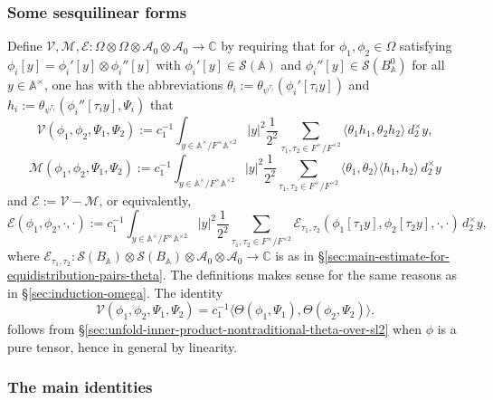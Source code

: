 \documentclass[reqno,10pt]{amsart}
\theoremstyle{plain} %
\theoremstyle{definition}
\theoremstyle{plain} %
\theoremstyle{remark}
\theoremstyle{itplain} %
\theoremstyle{remark} %
\numberwithin{equation}{section}
\begin{document}
\subsubsection{Some sesquilinear forms}\label{sec:35ac3e5754}
Define $\mathcal{V}, \mathcal{M}, \mathcal{E} : \Omega \otimes \Omega \otimes \mathcal{A}_0 \otimes \mathcal{A}_0 \rightarrow \mathbb{C}$ by requiring that for $\phi_1, \phi_2 \in \Omega$ satisfying $\phi_i[y] = \phi_i'[y] \otimes \phi_i''[y]$ with $\phi_i'[y] \in \mathcal{S}(\mathbb{A})$ and $ \phi_i''[y] \in \mathcal{S}(B_\mathbb{A}^0)$ for all $y \in \mathbb{A}^\times$, one has with the abbreviations $\theta_i := \theta_{\psi^{\tau_i}}(\phi_i'[\tau_i y])$ and $h_i := \theta_{\psi^{\tau_i}}(\phi_i''[\tau_i y],\Psi_i)$ that
\[
  \mathcal{V}(\phi_1,\phi_2,\Psi_1,\Psi_2) := c_1^{-1} \int_{y \in \mathbb{A}^\times / F^\times \mathbb{A}^{\times 2}} |y|^2 \frac { 1 } { 2^2 } \sum_{\tau_1,\tau_2 \in F^\times / F^{\times 2}} \langle \theta_1 h_1, \theta_2 h_2 \rangle \, d_2^\times y,
\]
\[
  \mathcal{M}(\phi_1,\phi_2,\Psi_1,\Psi_2) := c_1^{-1} \int_{y \in \mathbb{A}^\times / F^\times \mathbb{A}^{\times 2}} |y|^2 \frac { 1 } { 2^2 } \sum_{\tau_1,\tau_2 \in F^\times / F^{\times 2}} \langle \theta_1, \theta_2 \rangle \langle h_1, h_2 \rangle  \, d_2^\times y
\]
and $\mathcal{E} := \mathcal{V} - \mathcal{M}$, or equivalently,
\begin{equation}
  \mathcal{E}(\phi_1,\phi_2,\cdot ,\cdot )
  := c_1^{-1}
  \int_{y \in \mathbb{A}^\times / F^\times \mathbb{A}^{\times 2}} |y|^2
  \frac
  {
    1
  }
  {
    2^2
  }
  \sum_{\tau_1,\tau_2 \in F^\times / F^{\times 2}}
  \mathcal{E}_{\tau_1,\tau_2}(\phi_1[\tau_1 y], \phi_2[\tau_2
  y],\cdot,\cdot )  \, d_2^\times y,
\end{equation}
where $\mathcal{E}_{\tau_1,\tau_2} : \mathcal{S}(B_\mathbb{A}) \otimes \mathcal{S}(B_\mathbb{A}) \otimes \mathcal{A}_0 \otimes \mathcal{A}_0 \rightarrow \mathbb{C}$ is as in \S\ref{sec:main-estimate-for-equidistribution-pairs-theta}.  The definitions makes sense for the same reasons as in \S\ref{sec:induction-omega}.  The identity
\begin{equation}\label{eqn:c1-times-error-equals-bla}
  \mathcal{V}(\phi_1,\phi_2,\Psi_1,\Psi_2)
  = c_1^{-1} \langle \Theta(\phi_1, \Psi_1), \Theta(\phi_2, \Psi_2) \rangle.
\end{equation}
follows from \S\ref{sec:unfold-inner-product-nontraditional-theta-over-sl2} when $\phi$ is a pure tensor, hence in general by linearity.

\subsubsection{The main identities}\label{sec:main-identity}
\end{document}
